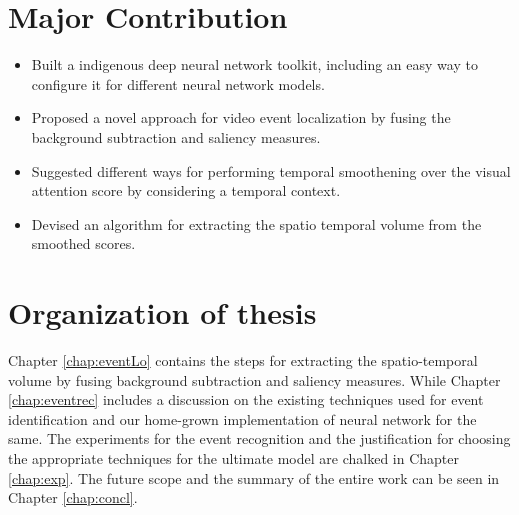 \section{Major Contribution}
\begin{itemize}
	\item{Built a indigenous deep neural network toolkit, including an easy way to configure
it for different neural network models.}
	\item{Proposed a novel approach for video event localization by fusing the background subtraction and saliency measures.}
	\item{Suggested different ways for performing temporal smoothening over the visual attention score by considering a temporal context.}
	\item{Devised an algorithm for extracting the spatio temporal volume from the smoothed scores.}
\end{itemize}

\section{Organization of thesis}
\par Chapter \ref{chap:eventLo} contains the steps for extracting the spatio-temporal volume by fusing background subtraction and saliency measures.  While Chapter \ref{chap:eventrec} includes a discussion on the existing techniques used for event identification and our home-grown implementation of neural network for the same.  The experiments for the event recognition and the justification for choosing the appropriate techniques for the ultimate model are chalked in Chapter \ref{chap:exp}.  The future scope and the summary of the entire work can be seen in Chapter \ref{chap:concl}.